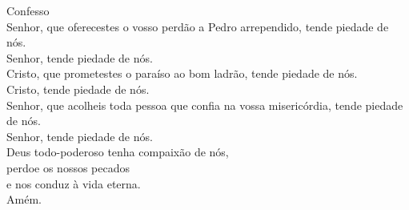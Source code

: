 \textcolor{VioletRed1}{Confesso}
\vspace{0.2cm} \\
\VbarRed{} Senhor, que oferecestes o vosso perdão a Pedro arrependido, tende piedade de nós.\\
\RbarRed{} Senhor, tende piedade de nós.
\vspace{0.1cm} \\
\VbarRed{} Cristo, que prometestes o paraíso ao bom ladrão, tende piedade de nós.\\
\RbarRed{} Cristo, tende piedade de nós.
\vspace{0.1cm} \\
\VbarRed{} Senhor, que acolheis toda pessoa que confia na vossa misericórdia, tende piedade de nós.\\
\RbarRed{} Senhor, tende piedade de nós.
\vspace{0.1cm} \\
Deus todo-poderoso tenha compaixão de nós, \\
perdoe os nossos pecados \\
e nos conduz à vida eterna. \\
\RbarRed{} Amém.
\vspace{0.2cm} \\
